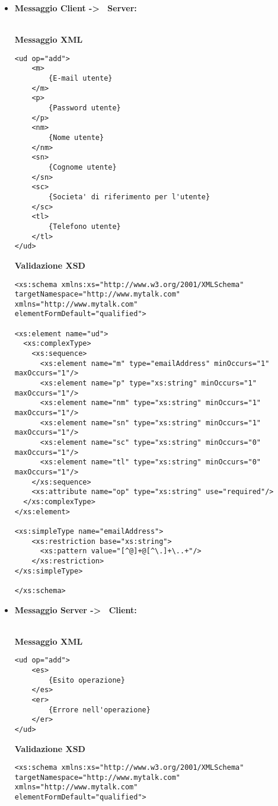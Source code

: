 {{\begin{itemize}
			\item[] \textbf{Messaggio Client -\textgreater~ Server:}{\\
			\textbf{Messaggio XML}\\
				\begin{lstlisting}
<ud op="add">
	<m>
		{E-mail utente}
	</m>
	<p>
		{Password utente}
	</p>
	<nm>
		{Nome utente}
	</nm>
	<sn>
		{Cognome utente}
	</sn>
	<sc>
		{Societa' di riferimento per l'utente}
	</sc>
	<tl>
		{Telefono utente}
	</tl>
</ud>
				\end{lstlisting}
				\textbf{Validazione XSD}\\
				\begin{lstlisting}
<xs:schema xmlns:xs="http://www.w3.org/2001/XMLSchema"
targetNamespace="http://www.mytalk.com"
xmlns="http://www.mytalk.com"
elementFormDefault="qualified">

<xs:element name="ud">
  <xs:complexType>
    <xs:sequence>
      <xs:element name="m" type="emailAddress" minOccurs="1" maxOccurs="1"/>
      <xs:element name="p" type="xs:string" minOccurs="1" maxOccurs="1"/>
      <xs:element name="nm" type="xs:string" minOccurs="1" maxOccurs="1"/>
      <xs:element name="sn" type="xs:string" minOccurs="1" maxOccurs="1"/>
      <xs:element name="sc" type="xs:string" minOccurs="0" maxOccurs="1"/>
      <xs:element name="tl" type="xs:string" minOccurs="0" maxOccurs="1"/>
    </xs:sequence>
    <xs:attribute name="op" type="xs:string" use="required"/>
  </xs:complexType>
</xs:element>

<xs:simpleType name="emailAddress"> 
    <xs:restriction base="xs:string"> 
      <xs:pattern value="[^@]+@[^\.]+\..+"/> 
    </xs:restriction> 
</xs:simpleType> 

</xs:schema>
				\end{lstlisting}
				}
				
				\item[] \textbf{Messaggio Server -\textgreater~ Client:}{\\
				\textbf{Messaggio XML}\\
				\begin{lstlisting}
<ud op="add">
	<es>
		{Esito operazione}
	</es>
	<er>
		{Errore nell'operazione}
	</er>
</ud>
				\end{lstlisting}
				\textbf{Validazione XSD}\\
				\begin{lstlisting}
<xs:schema xmlns:xs="http://www.w3.org/2001/XMLSchema"
targetNamespace="http://www.mytalk.com"
xmlns="http://www.mytalk.com"
elementFormDefault="qualified">


\end{lstlisting}}
\end{itemize}}}
